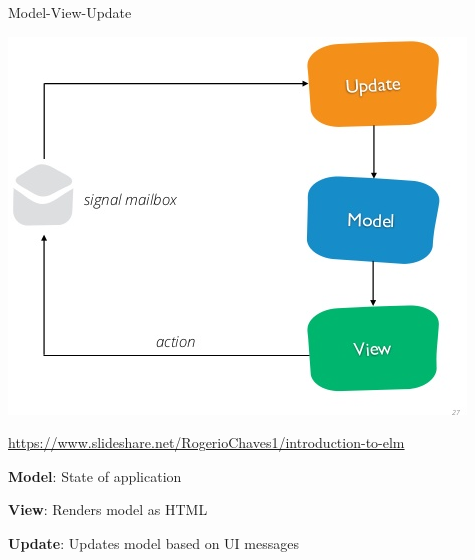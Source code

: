 \documentclass[11.5pt, aspectratio=169]{beamer}
\begin{document}

\begin{frame}{Model-View-Update}

  \begin{center}
    \includegraphics[scale=1.3]{images/mvu.png}

    \hfill {\tiny \url{https://www.slideshare.net/RogerioChaves1/introduction-to-elm}}
  \end{center}

  \begin{fullpageitemize}
  \item {\Large \textbf{Model}: State of application}
  \item {\Large \textbf{View}: Renders model as HTML}
  \item {\Large \textbf{Update}: Updates model based on UI messages}
  \end{fullpageitemize}

\end{frame}
\end{document}
